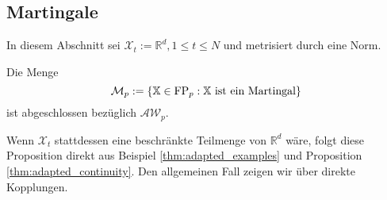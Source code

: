 \subsection{Martingale}
In diesem Abschnitt sei $\mathcal{X}_t := \mathbb{R}^d, 1\leq t \leq N$ und metrisiert durch eine Norm.
\begin{proposition}
    Die Menge 
    $$\mathcal{M}_p := \{\mathbb{X} \in \operatorname{FP}_p: \mathbb{X} \text{ ist ein Martingal} \}$$
    ist abgeschlossen bezüglich $\mathcal{AW}_p$.
\end{proposition}
Wenn $\mathcal{X}_t$ stattdessen eine beschränkte Teilmenge von $\mathbb{R}^d$ wäre, folgt diese Proposition direkt aus Beispiel \ref{thm:adapted_examples} und Proposition \ref{thm:adapted_continuity}. Den allgemeinen Fall zeigen wir über direkte Kopplungen.
